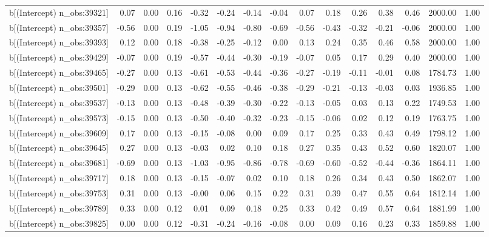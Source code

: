 \begin{table}[ht]
\begin{tabular}{rrrrrrrrrrrrrrr}
  b[(Intercept) n\_obs:39321] & 0.07 & 0.00 & 0.16 & -0.32 & -0.24 & -0.14 & -0.04 & 0.07 & 0.18 & 0.26 & 0.38 & 0.46 & 2000.00 & 1.00 \\ 
  b[(Intercept) n\_obs:39357] & -0.56 & 0.00 & 0.19 & -1.05 & -0.94 & -0.80 & -0.69 & -0.56 & -0.43 & -0.32 & -0.21 & -0.06 & 2000.00 & 1.00 \\ 
  b[(Intercept) n\_obs:39393] & 0.12 & 0.00 & 0.18 & -0.38 & -0.25 & -0.12 & 0.00 & 0.13 & 0.24 & 0.35 & 0.46 & 0.58 & 2000.00 & 1.00 \\ 
  b[(Intercept) n\_obs:39429] & -0.07 & 0.00 & 0.19 & -0.57 & -0.44 & -0.30 & -0.19 & -0.07 & 0.05 & 0.17 & 0.29 & 0.40 & 2000.00 & 1.00 \\ 
  b[(Intercept) n\_obs:39465] & -0.27 & 0.00 & 0.13 & -0.61 & -0.53 & -0.44 & -0.36 & -0.27 & -0.19 & -0.11 & -0.01 & 0.08 & 1784.73 & 1.00 \\ 
  b[(Intercept) n\_obs:39501] & -0.29 & 0.00 & 0.13 & -0.62 & -0.55 & -0.46 & -0.38 & -0.29 & -0.21 & -0.13 & -0.03 & 0.03 & 1936.85 & 1.00 \\ 
  b[(Intercept) n\_obs:39537] & -0.13 & 0.00 & 0.13 & -0.48 & -0.39 & -0.30 & -0.22 & -0.13 & -0.05 & 0.03 & 0.13 & 0.22 & 1749.53 & 1.00 \\ 
  b[(Intercept) n\_obs:39573] & -0.15 & 0.00 & 0.13 & -0.50 & -0.40 & -0.32 & -0.23 & -0.15 & -0.06 & 0.02 & 0.12 & 0.19 & 1763.75 & 1.00 \\ 
  b[(Intercept) n\_obs:39609] & 0.17 & 0.00 & 0.13 & -0.15 & -0.08 & 0.00 & 0.09 & 0.17 & 0.25 & 0.33 & 0.43 & 0.49 & 1798.12 & 1.00 \\ 
  b[(Intercept) n\_obs:39645] & 0.27 & 0.00 & 0.13 & -0.03 & 0.02 & 0.10 & 0.18 & 0.27 & 0.35 & 0.43 & 0.52 & 0.60 & 1820.07 & 1.00 \\ 
  b[(Intercept) n\_obs:39681] & -0.69 & 0.00 & 0.13 & -1.03 & -0.95 & -0.86 & -0.78 & -0.69 & -0.60 & -0.52 & -0.44 & -0.36 & 1864.11 & 1.00 \\ 
  b[(Intercept) n\_obs:39717] & 0.18 & 0.00 & 0.13 & -0.15 & -0.07 & 0.02 & 0.10 & 0.18 & 0.26 & 0.34 & 0.43 & 0.50 & 1862.07 & 1.00 \\ 
  b[(Intercept) n\_obs:39753] & 0.31 & 0.00 & 0.13 & -0.00 & 0.06 & 0.15 & 0.22 & 0.31 & 0.39 & 0.47 & 0.55 & 0.64 & 1812.14 & 1.00 \\ 
  b[(Intercept) n\_obs:39789] & 0.33 & 0.00 & 0.12 & 0.01 & 0.09 & 0.18 & 0.25 & 0.33 & 0.42 & 0.49 & 0.57 & 0.64 & 1881.99 & 1.00 \\ 
  b[(Intercept) n\_obs:39825] & 0.00 & 0.00 & 0.12 & -0.31 & -0.24 & -0.16 & -0.08 & 0.00 & 0.09 & 0.16 & 0.23 & 0.33 & 1859.88 & 1.00 \\ 

\end{tabular}
\end{table}

